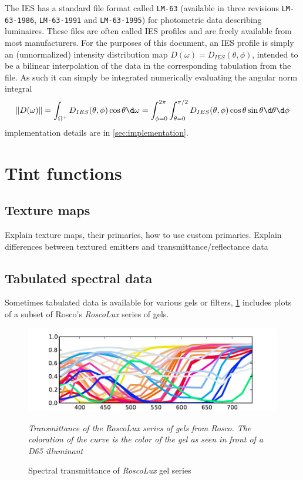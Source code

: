 The \gls{IES} has a standard file format called \texttt{LM-63} (available in
three revisions \texttt{LM-63-1986}, \texttt{LM-63-1991} and
\texttt{LM-63-1995}) for photometric data describing luminaires. These files
are often called \gls{IES} profiles and are freely available from most
manufacturers. For the purposes of this document, an \gls{IES} profile
is simply an (unnormalized) intensity distribution map $D(\omega) =
D_{IES}(\theta,\phi)$, intended to be a bilinear interpolation of the data in
the corresponding tabulation from the file. As such it can simply be integrated
numerically evaluating the angular norm integral
\begin{equation}
\|D(\omega)\|
   = \int_{\Omega^+}  D_{IES}(\theta,\phi) \cos\theta \d\omega
   = \int_{\phi = 0}^{2\pi} \int_{\theta = 0}^{\pi/2}
        D_{IES}(\theta,\phi) \cos\theta \sin\theta \d\theta \d\phi
\end{equation}
implementation details are in \cref{sec:implementation}.

\section{Tint functions}

\subsection{Texture maps}
Explain texture maps, their primaries, how to use custom primaries.
Explain differences between textured emitters and transmittance/reflectance data


\subsection{Tabulated spectral data}
Sometimes tabulated data is available for various gels or filters, \cref{fig:roscolux}
includes plots of a subset of Rosco's \emph{RoscoLux} series of gels.

\begin{figure}
{
\centering
\includegraphics{figures/roscolux.pdf}
\caption{Spectral transmittance of \emph{RoscoLux} gel series}
\label{fig:roscolux}
}
\vskip 1mm
{\footnotesize\it Transmittance of the \emph{RoscoLux} series of gels from
Rosco. The coloration of the curve is the color of the gel as seen in front
of a D65 illuminant}
\end{figure}

